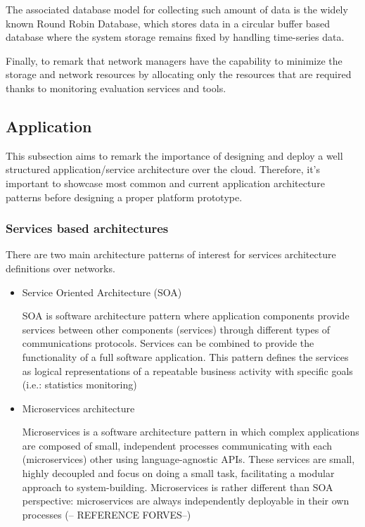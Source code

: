 The associated database model for collecting such amount of data is the widely known Round Robin Database, which stores data in a circular buffer based database where the system storage remains fixed by handling time-series data. 

Finally, to remark that network managers have the capability to minimize the storage and network resources by allocating only the resources that are required thanks to monitoring evaluation services and tools.

\subsection{Application}\label{SOA:coreService}

This subsection aims to remark the importance of designing and deploy a well structured application/service architecture over the cloud. Therefore, it's important to showcase most common and current application architecture patterns before designing a proper platform prototype.

\subsubsection{Services based architectures}\label{SOA:appArch}

There are two main architecture patterns of interest for services architecture definitions over networks. 

\begin{itemize}
\item Service Oriented Architecture (SOA) \hfill

SOA is software architecture pattern where application components provide services between other components (services) through different types of communications protocols. Services can be combined to provide the functionality of a full software application.
This pattern defines the services as logical representations of a repeatable business activity with specific goals (i.e.: statistics monitoring)

\item Microservices architecture \hfill

Microservices is a software architecture pattern in which complex applications are composed of small, independent processes communicating with each (microservices) other using language-agnostic APIs. These services are small, highly decoupled and focus on doing a small task, facilitating a modular approach to system-building. 
Microservices is rather different than SOA perspective: microservices are always independently deployable in their own processes  (-- REFERENCE FORVES--)

\end{itemize}

